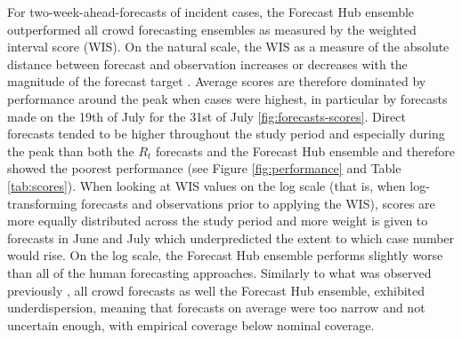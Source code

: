 \documentclass[10pt,a4paper,twocolumn]{article}
\begin{document}
For two-week-ahead-forecasts of incident cases, the Forecast Hub ensemble outperformed all crowd forecasting ensembles as measured by the weighted interval score (WIS). On the natural scale, the WIS as a measure of the absolute distance between forecast and observation increases or decreases with the magnitude of the forecast target \cite{bosseTransformationForecastsEvaluating2023, bracherEvaluatingEpidemicForecasts2021}. Average scores are therefore dominated by performance around the peak when cases were highest, in particular by forecasts made on the 19th of July for the 31st of July \ref{fig:forecasts-scores}. Direct forecasts tended to be higher throughout the study period and especially during the peak than both the $R_t$ forecasts and the Forecast Hub ensemble and therefore showed the poorest performance (see Figure \ref{fig:performance} and Table \ref{tab:scores}). When looking at WIS values on the log scale (that is, when log-transforming forecasts and observations prior to applying the WIS), scores are more equally distributed across the study period and more weight is given to forecasts in June and July which underpredicted the extent to which case number would rise. On the log scale, the Forecast Hub ensemble performs slightly worse than all of the human forecasting approaches. Similarly to what was observed previously \citep{bosseComparingHumanModelbased2022, sherrattPredictivePerformanceMultimodel2022a}, all crowd forecasts as well the Forecast Hub ensemble, exhibited underdispersion, meaning that forecasts on average were too narrow and not uncertain enough, with empirical coverage below nominal coverage.  

\begin{table}[!h]
\centering
{}
\caption{Table caption}
\label{tab:scores}
\end{table}
\end{document}
